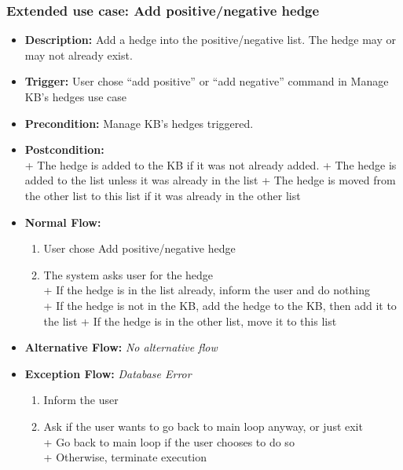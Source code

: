 \documentclass[../gr-final.tex]{subfiles}
\begin{document}
\subsubsection{Extended use case: Add positive/negative hedge}
\begin{itemize}
  \item {\bfseries Description:} Add a hedge into the
    positive/negative list. The hedge may or may not already
    exist.
  \item {\bfseries Trigger:} User chose ``add positive'' or
    ``add negative'' command in
    Manage KB's hedges use case
  \item {\bfseries Precondition:} Manage KB's hedges triggered.
  \item {\bfseries Postcondition:}\\
    \indent + The hedge is added to the KB if it was not already
    added.
    \indent + The hedge is added to the list unless it
    was already in the list
    \indent + The hedge is moved from the other list to this list
    if it was already in the other list
  \item {\bfseries Normal Flow:}
    \begin{enumerate}
      \item User chose Add positive/negative hedge 
      \item The system asks user for the hedge\\
        \indent + If the hedge is in the list already, inform the
        user and do nothing   \\
        \indent + If the hedge is not in the KB, add the hedge to
        the KB, then add it to the list
        \indent + If the hedge is in the other list, move it to
        this list
    \end{enumerate}
  \item {\bfseries Alternative Flow:} {\em No alternative flow}
  \item {\bfseries Exception Flow:}
    {\em Database Error}
    \begin{enumerate}
      \item Inform the user
      \item Ask if the user wants to go back to main loop anyway,
        or just exit\\
        \indent + Go back to main loop if the user chooses to do
        so\\
        \indent + Otherwise, terminate execution
    \end{enumerate}
\end{itemize}
\end{document}
